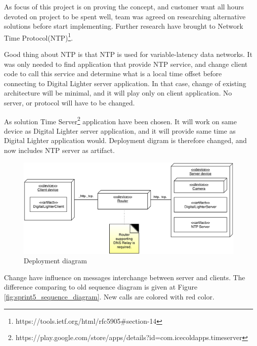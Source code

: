 As focus of this project is on proving the concept, and customer want all hours devoted on project to be spent well, team was agreed on researching alternative solutions before start implementing. Further research have brought to Network Time Protocol(NTP)\footnote{https://tools.ietf.org/html/rfc5905\#section-14}.

Good thing about NTP is that NTP is used for variable-latency data networks. It was only needed to find application that provide NTP service, and change client code to call this service and determine what is a local time offset before connecting to Digital Lighter server application. In that case, change of existing architecture will be minimal, and it will play only on client application. No server, or protocol will have to be changed.

As solution Time Server\footnote{https://play.google.com/store/apps/details?id=com.icecoldapps.timeserver} application have been chosen. It will work on same device as Digital Lighter server application, and it will provide same time as Digital Lighter application would. Deployment digram is therefore changed, and now includes NTP server as artifact. 

\begin{figure}[H]
	\centering
		\includegraphics[width=15cm]{images/deployment-diagram-sprint5}
	\caption{Deployment diagram}
	\label{fig:sprint5_deployment_diagram}
\end{figure}

Change have influence on messages interchange between server and clients. The difference comparing to old sequence diagram is given at Figure \ref{fig:sprint5_sequence_diagram}. New calls are colored with red color. 


